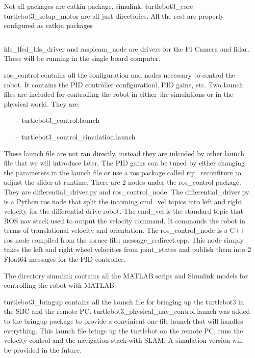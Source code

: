 \documentclass[12]{article}
\begin{document}
Not all packages are catkin package. simulink, turtlebot3\_core turtlebot3\_setup\_motor are all just directories. All the rest are properly configured as catkin packages

\begin{lstlisting}[style=bash]

\end{lstlisting}
\newpage

hls\_lfcd\_lds\_driver and raspicam\_node are drivers for the PI Camera and lidar. 
These will be running in the single board computer. 

ros\_control contains all the configuration and nodes necessary to control the robot. 
It contains the PID controller configurationl, PID gains, etc.
Two launch files are included for controlling the robot in either the simulations or in the physical world. They are:

\begin{itemize}
	\item[--] turtlebot3\_control.launch
	\item[--] turtlebot3\_control\_simulation.launch
\end{itemize}  
These launch file are not ran directly, instead they are inlcuded by other launch file that we will introduce later.
The PID gains can be tuned by either changing the parameters in the launch file or use a ros package called rqt\_reconfiture to adjust the slider at runtime. 
There are 2 nodes under the ros\_control package. They are differential\_driver.py and ros\_control\_node. 
The differential\_driver.py is a Python ros node that split the incoming \/cmd\_vel topics into left and right velocity for the differential drive robot. 
The \/cmd\_vel is the standard topic that ROS nav stack used to output the velocity command. It commands the robot in terms of translational velocity and orientation. 
The ros\_control\_node is a C++ ros node compiled from the soruce file: message\_redirect.cpp. 
This node simply takes the left and right wheel velocities from \/joint\_states and publish them into 2 Float64 messages for the PID controller. 

The directory simulink contains all the MATLAB scrips and Simulink models for controlling the robot with MATLAB 

turtlebot3\_bringup contains all the launch file for bringing up the turtlebot3 in the SBC and the remote PC. 
turtlebot3\_physical\_nav\_control.launch was added to the bringup package to provide a convinient one-file launch that will handles everything. 
This launch file brings up the turtlebot on the remote PC, runs the velocity control and the navigation stack with SLAM. A simulation version will be provided in the future.
\end{document}
